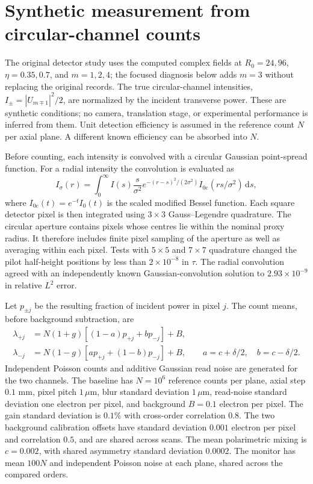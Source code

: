 \section{Synthetic measurement from circular-channel counts}
\label{sec:count-measurement}
The original detector study uses the computed complex fields at $R_0=24,96$,
$\eta=0.35,0.7$, and $m=1,2,4$; the focused diagnosis below adds $m=3$
without replacing the original records. The true circular-channel intensities,
$I_\pm=|U_{m\mp1}|^2/2$, are normalized by the incident transverse power.
These are synthetic conditions; no camera, translation stage, or experimental
performance is inferred from them. Unit detection efficiency is assumed in
the reference count $N$ per axial plane. A different known efficiency can be
absorbed into $N$.

Before counting, each intensity is convolved with a circular Gaussian
point-spread function. For a radial intensity the convolution is evaluated as
\begin{equation}
 I_\sigma(r)=\int_0^\infty I(s)\frac{s}{\sigma^2}
 e^{-(r-s)^2/(2\sigma^2)} I_{0e}(rs/\sigma^2)\,\mathrm{d}s,
\end{equation}
where $I_{0e}(t)=e^{-t}I_0(t)$ is the scaled modified Bessel function.
Each square detector pixel is then integrated using $3\times3$
Gauss--Legendre quadrature. The circular aperture contains pixels whose
centres lie within the nominal proxy radius. It therefore includes finite
pixel sampling of the aperture as well as averaging within each pixel.
Tests with $5\times5$ and $7\times7$ quadrature changed the pilot half-height
positions by less than $2\times10^{-8}$ in $\tau$. The radial convolution
agreed with an independently known Gaussian-convolution solution to
$2.93\times10^{-9}$ in relative $L^2$ error.

Let $p_{\pm j}$ be the resulting fraction of incident power in pixel $j$.
The count means, before background subtraction, are
\begin{align}
 \lambda_{+j}&=N(1+g)[(1-a)p_{+j}+b p_{-j}]+B,\\
 \lambda_{-j}&=N(1-g)[a p_{+j}+(1-b)p_{-j}]+B,
 \qquad a=c+\delta/2,\quad b=c-\delta/2.
\end{align}
Independent Poisson counts and additive Gaussian read noise are generated
for the two channels. The baseline has $N=10^6$ reference counts per plane,
axial step $0.1$ mm, pixel pitch $1\,\mu$m, blur standard deviation
$1\,\mu$m, read-noise standard deviation one electron per pixel, and
background $B=0.1$ electron per pixel. The gain standard deviation is
$0.1\%$ with cross-order correlation $0.8$. The two background calibration
offsets have standard deviation $0.001$ electron per pixel and correlation
$0.5$, and are shared across scans. The mean polarimetric mixing is
$c=0.002$, with shared asymmetry standard deviation $0.0002$.
The monitor has mean $100N$ and independent Poisson noise at each plane,
shared across the compared orders.

